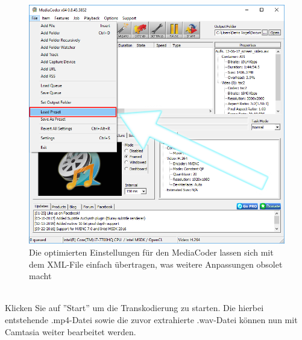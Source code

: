 \documentclass{scrreprt}
\begin{document}
\\
\begin{figure}[h]
    \centering
    \includegraphics[width=1\textwidth]{mediacoder.png}
    \caption{Die optimierten Einstellungen für den MediaCoder lassen sich mit dem XML-File einfach übertragen, was weitere Anpassungen obsolet macht}
    \label{fig:mediacoder}
\end{figure}
\\
Klicken Sie auf ''Start'' um die Transkodierung zu starten. Die hierbei entstehende .mp4-Datei sowie die zuvor extrahierte .wav-Datei können nun mit Camtasia weiter bearbeitet werden.
\\
\pagebreak
\end{document}
